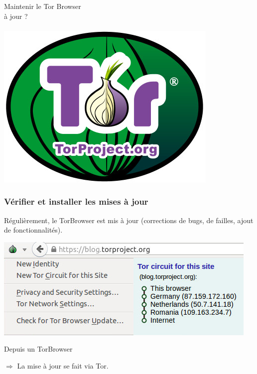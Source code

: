 \documentclass{beamer}
\begin{document}
\begin{frame}
\begin{center}
\Huge{Maintenir le Tor Browser \\ à jour ? }
\\~\\ \includegraphics[scale=0.4]{./images/logo_tor.jpg}
\end{center}
\end{frame}

\begin{frame}
\frametitle{Vérifier et installer les mises à jour}

Régulièrement, le TorBrowser est mis à jour (corrections de bugs, de failles, ajout de fonctionnalités).
\begin{center}
\includegraphics[scale=0.6]{./images/onionmenu.jpg}
\end{center}

\begin{block}{Depuis un TorBrowser}
\begin{itemize}
\end{itemize}
$\Rightarrow$  La mise à jour se fait via Tor.
\end{block}
\end{frame}
\end{document}

